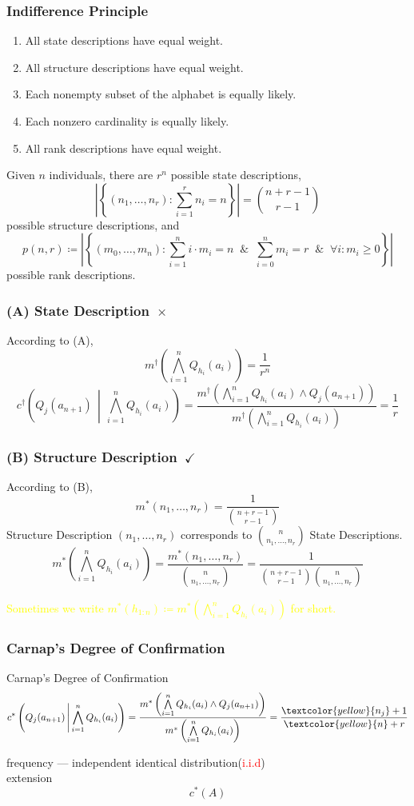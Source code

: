 \documentclass[UTF8,11pt,colorlinks,compress,openany]{beamer}%
\begin{document}
\begin{frame}\frametitle{Indifference Principle}
	\begin{enumerate}[A]
		\item All state descriptions have equal weight.
		\item All structure descriptions have equal weight.
		\item Each nonempty subset of the alphabet is equally
		likely.
		\item Each nonzero cardinality is equally likely.
		\item All rank descriptions have equal weight.
	\end{enumerate}
	Given $n$ individuals, there are $r^n$ possible state descriptions,
	\[\left|\left\{(n_1,\ldots,n_r): \sum\limits_{i=1}^r n_i=n\right\}\right|=\binom{n+r-1}{r-1}\]
	possible structure descriptions, and 
	\[p(n,r)\coloneqq \left|\left\{(m_0,\ldots,m_n): \sum\limits_{i=1}^n i\cdot m_i=n\;\;\&\;\;\sum\limits_{i=0}^n m_i=r\;\;\&\;\;\forall i: m_i\geq 0 \right\}\right|\]
	possible rank descriptions.
\end{frame}

\begin{frame}\frametitle{(A) State Description~$\times$}
	According to (A),
	\[m^\dagger\left(\bigwedge\limits_{i=1}^n Q_{h_i}(a_i)\right)=\dfrac{1}{r^n}\]
	\[c^\dagger\left(Q_j(a_{n+1})\,\middle|\,\bigwedge\limits_{i=1}^n Q_{h_i}(a_i)\right)=\dfrac{m^\dagger\left(\bigwedge\limits_{i=1}^n Q_{h_i}(a_i)\wedge Q_j(a_{n+1})\right)}{m^\dagger\left(\bigwedge\limits_{i=1}^n Q_{h_i}(a_i)\right)}=\dfrac{1}{r}\]
\end{frame}

\begin{frame}\frametitle{(B) Structure Description~$\checkmark$}
	According to (B),
	\[m^*(n_1,\ldots,n_r)=\frac{1}{\binom{n+r-1}{r-1}}\]
	Structure Description $(n_1,\ldots,n_r)$ corresponds to $\binom{n}{n_1,\ldots,n_r}$ State Descriptions.
	\[m^*\left(\bigwedge\limits_{i=1}^n Q_{h_i}(a_i)\right)=\dfrac{m^*(n_1,\ldots,n_r)}{\binom{n}{n_1,\ldots,n_r}}=\dfrac{1}{\binom{n+r-1}{r-1} \binom{n}{n_1,\ldots,n_r}}\]
	\begin{center}
		\textcolor{yellow}{Sometimes we write $m^*(h_{1:n})\coloneqq m^*\left(\bigwedge\limits_{i=1}^n Q_{h_i}(a_i)\right)$ for short.}
	\end{center}
\end{frame}

\begin{frame}\frametitle{Carnap's Degree of Confirmation}
	\begin{block}{Carnap's Degree of Confirmation}
		\[c^*\left(Q_j(a_{n+1})\,\middle|\,\bigwedge\limits_{i=1}^n Q_{h_i}(a_i)\right)=\frac{m^*\left(\bigwedge\limits_{i=1}^n Q_{h_i}(a_i)\wedge Q_j(a_{n+1})\right)}{m^*\left(\bigwedge\limits_{i=1}^n Q_{h_i}(a_i)\right)}=\frac{\textcolor{yellow}{n_j}+1}{\textcolor{yellow}{n}+r}\]
	\end{block}
	frequency --- independent identical distribution(\textcolor{red}{i.i.d})\\
	extension
	\[c^*(A)\]
\end{frame}
\end{document}
